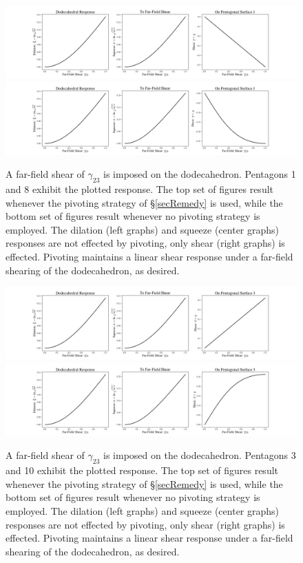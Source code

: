 \begin{figure}
	\centering
	\includegraphics[width=\textwidth]{figures/continuousShearWithPivot1.jpg}
	\includegraphics[width=\textwidth]{figures/continuousShearNoPivot1.jpg}
	\caption{A far-field shear of $\gamma_{23}$ is imposed on the dodecahedron.  Pentagons 1 and 8 exhibit the plotted response.  The top set of figures result whenever the pivoting strategy of \S\ref{secRemedy} is used, while the bottom set of figures result whenever no pivoting strategy is employed.  The dilation (left graphs) and squeeze (center graphs) responses are not effected by pivoting, only shear (right graphs) is effected.  Pivoting maintains a linear shear response under a far-field shearing of the dodecahedron, as desired.}
	\label{figPivoting1}
\end{figure}

\begin{figure}
	\centering
	\includegraphics[width=\textwidth]{figures/continuousShearWithPivot3.jpg}
	\includegraphics[width=\textwidth]{figures/continuousShearNoPivot3.jpg}
	\caption{A far-field shear of $\gamma_{23}$ is imposed on the dodecahedron.  Pentagons 3 and 10 exhibit the plotted response.  The top set of figures result whenever the pivoting strategy of \S\ref{secRemedy} is used, while the bottom set of figures result whenever no pivoting strategy is employed.  The dilation (left graphs) and squeeze (center graphs) responses are not effected by pivoting, only shear (right graphs) is effected.  Pivoting maintains a linear shear response under a far-field shearing of the dodecahedron, as desired.}
	\label{figPivoting3}
\end{figure}


